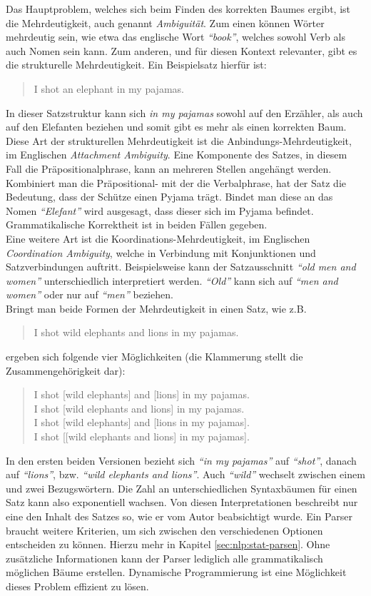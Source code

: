 Das Hauptproblem, welches sich beim Finden des korrekten Baumes ergibt, ist die Mehrdeutigkeit, auch genannt \textit{Ambiguität}. Zum einen können Wörter mehrdeutig sein, wie etwa das englische Wort \textit{``book''}, welches sowohl Verb als auch Nomen sein kann. Zum anderen, und für diesen Kontext relevanter, gibt es die strukturelle Mehrdeutigkeit. Ein Beispielsatz hierfür ist: 
\begin{quote}
I shot an elephant in my pajamas.
\end{quote}
In dieser Satzstruktur kann sich \textit{in my pajamas} sowohl auf den Erzähler, als auch auf den Elefanten beziehen und somit gibt es mehr als einen korrekten Baum. \\ 
Diese Art der strukturellen Mehrdeutigkeit ist die Anbindungs-Mehrdeutigkeit, im Englischen \textit{Attachment Ambiguity}. Eine Komponente des Satzes, in diesem Fall die Präpositionalphrase, kann an mehreren Stellen angehängt werden. Kombiniert man die Präpositional- mit der die Verbalphrase, hat der Satz die Bedeutung, dass der Schütze einen Pyjama trägt. Bindet man diese an das Nomen \textit{``Elefant''} wird ausgesagt, dass dieser sich im Pyjama befindet. Grammatikalische Korrektheit ist in beiden Fällen gegeben. \\
Eine weitere Art ist die Koordinations-Mehrdeutigkeit, im Englischen \textit{Coordination Ambiguity}, welche in Verbindung mit Konjunktionen und Satzverbindungen auftritt. Beispielsweise kann der Satzausschnitt \textit{``old men and women''} unterschiedlich interpretiert werden. \textit{``Old''} kann sich auf \textit{``men and women''} oder nur auf \textit{``men''} beziehen. \\
Bringt man beide Formen der Mehrdeutigkeit in einen Satz, wie z.B. 
\begin{quote}
I shot wild elephants and lions in my pajamas.
\end{quote}
ergeben sich folgende vier Möglichkeiten (die Klammerung stellt die Zusammengehörigkeit dar): 
\begin{quote}
I shot [wild elephants] and [lions] in my pajamas.\\
I shot [wild elephants and lions] in my pajamas.\\
I shot [wild elephants] and [lions in my pajamas].\\
I shot [[wild elephants and lions] in my pajamas].\\
\end{quote}
In den ersten beiden Versionen bezieht sich \textit{``in my pajamas''} auf \textit{``shot''}, danach auf \textit{``lions''}, bzw. \textit{``wild elephants and lions''}. Auch \textit{``wild''} wechselt zwischen einem und zwei Bezugswörtern. Die Zahl an unterschiedlichen Syntaxbäumen für einen Satz kann also exponentiell wachsen.
Von diesen Interpretationen beschreibt nur eine den Inhalt des Satzes so, wie er vom Autor beabsichtigt wurde. Ein Parser braucht weitere Kriterien, um sich zwischen den verschiedenen Optionen entscheiden zu können. Hierzu mehr in Kapitel \ref{sec:nlp:stat-parsen}. Ohne zusätzliche Informationen kann der Parser lediglich alle grammatikalisch möglichen Bäume erstellen. Dynamische Programmierung ist eine Möglichkeit dieses Problem effizient zu lösen.

